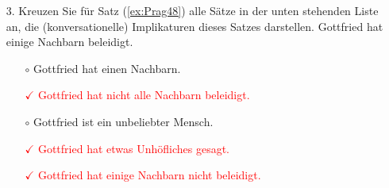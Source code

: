 {\begin{frame}
\begin{enumerate}
\end{enumerate}

\end{frame}


\begin{frame}

\begin{enumerate}
\item[3.] Kreuzen Sie für Satz (\ref{ex:Prag48}) alle Sätze in der unten stehenden Liste an, die (konversationelle) Implikaturen dieses Satzes darstellen.
\ea \label{ex:Prag48} Gottfried hat einige Nachbarn beleidigt.
\z 
\begin{itemize}
\item[$\circ$] Gottfried hat einen Nachbarn.
\item[\textcolor{red}{$\checkmark$}] \textcolor{red}{Gottfried hat nicht alle Nachbarn beleidigt.}
\item[$\circ$] Gottfried ist ein unbeliebter Mensch.
\item[\textcolor{red}{$\checkmark$}] \textcolor{red}{Gottfried hat etwas Unhöfliches gesagt.}
\item[\textcolor{red}{$\checkmark$}] \textcolor{red}{Gottfried hat einige Nachbarn nicht beleidigt.}
\end{itemize}

\end{enumerate}

\end{frame}

}



\nocite{Levinson1983}






